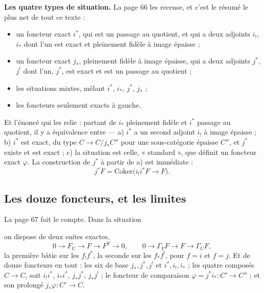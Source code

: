 \documentclass[11pt,a4paper]{article}
\begin{document}
\textbf{Les quatre types de situation.} La page 66 les recense, et c'est le
résumé le plus net de tout ce texte :

\begin{itemize}
\item un foncteur exact $i^{*}$, qui est un passage au quotient, et qui a deux
adjoints $i_{!}$, $i_{*}$ dont l'un est exact et pleinement fidèle à image
épaisse ;
\item un foncteur exact $j_{*}$, pleinement fidèle à image épaisse, qui a deux
adjoints $j^{*}$, $j^{!}$ dont l'un, $j^{*}$, est exact et est un passage au
quotient ;
\item les situations mixtes, mêlant $i^{*}$, $i_{*}$, $j^{*}$, $j_{*}$ ;
\item les foncteurs seulement exacts à gauche.
\end{itemize}

Et l'énoncé qui les relie : partant de $i_{*}$ pleinement fidèle et $i^{*}$
passage au quotient, il y a équivalence entre — a) $i^{*}$ a un second adjoint
$i_{!}$ à image épaisse ; b) $i^{*}$ est exact, du type $C \to C/j_{*}C''$
pour une sous-catégorie épaisse $C''$, et $j^{*}$ existe et est exact ;
c) la situation est celle, « standard », que définit un foncteur exact
$\varphi$. La construction de $j^{*}$ à partir de a) est immédiate :
\[
  j^{*}F = \mathrm{Coker}\bigl( i_{!} i^{*} F \longrightarrow F \bigr) .
\]

\subsection*{Les douze foncteurs, et les limites}

La page 67 fait le compte. Dans la situation


on dispose de deux suites exactes,
\[
  0 \longrightarrow F_{U} \longrightarrow F \longrightarrow F^{Y}
  \longrightarrow 0 , \qquad
  0 \longrightarrow \Gamma_{Y}F \longrightarrow F \longrightarrow \Gamma_{U}F ,
\]
la première bâtie sur les $f_{!}f^{*}$, la seconde sur les $f_{*}f^{!}$, pour
$f = i$ et $f = j$. Et de douze foncteurs en tout : les six de base
$j_{*}, j^{*}, j^{!}$ et $i^{*}, i_{!}, i_{*}$ ; les quatre composés
$C \to C$, soit $i_{!}i^{*}$, $i_{*}i^{*}$, $j_{*}j^{*}$, $j_{*}j^{!}$ ; le
foncteur de comparaison $\varphi = j^{*}i_{*} : C' \to C''$ ; et son prolongé
$j_{*}\varphi : C' \to C$.
\end{document}
